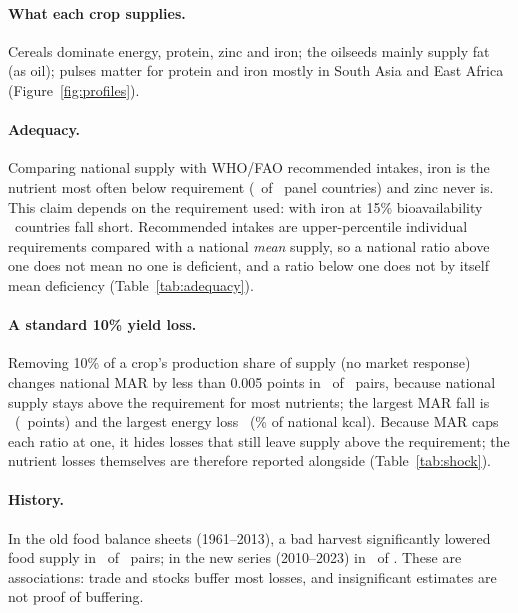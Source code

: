 \paragraph{What each crop supplies.} Cereals dominate energy, protein, zinc and iron; the oilseeds mainly
supply fat (as oil); pulses matter for protein and iron mostly in South Asia and East Africa
(Figure~\ref{fig:profiles}).

\paragraph{Adequacy.} Comparing national supply with WHO/FAO recommended intakes, iron is the nutrient
most often below requirement (\nIronShort\ of \nAdqCountries\ panel countries) and zinc never is. This
claim depends on the requirement used: with iron at 15\% bioavailability \nIronShortAlt\ countries fall
short. Recommended intakes are upper-percentile individual requirements compared with a national
\emph{mean} supply, so a national ratio above one does not mean no one is deficient, and a ratio below
one does not by itself mean deficiency (Table~\ref{tab:adequacy}).

\paragraph{A standard 10\% yield loss.} Removing 10\% of a crop's production share of supply (no market
response) changes national MAR by less than 0.005 points in \shockZeroMar\ of \shockN\ pairs, because
national supply stays above the requirement for most nutrients; the largest MAR fall is \shockTopMar\
(\shockTopMarValue\ points) and the largest energy loss \shockTopKcal\ (\shockTopKcalValue\% of national
kcal). Because MAR caps each ratio at one, it hides losses that still leave supply above the requirement;
the nutrient losses themselves are therefore reported alongside (Table~\ref{tab:shock}).

\paragraph{History.} In the old food balance sheets (1961--2013), a bad harvest significantly lowered food
supply in \passOldPos\ of \passOldN\ pairs; in the new series (2010--2023) in \passNewPos\ of \passNewN.
These are associations: trade and stocks buffer most losses, and insignificant estimates are not proof of
buffering.

